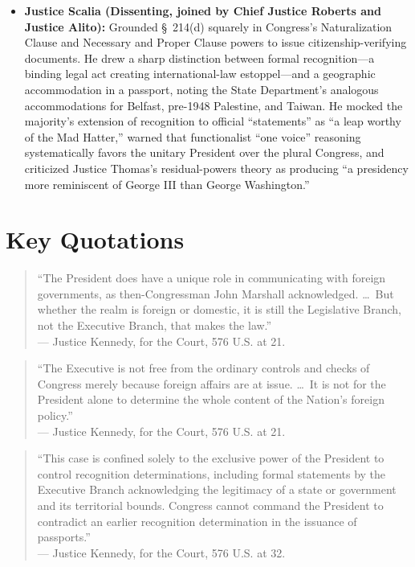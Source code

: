 \documentclass[12pt]{article}
\begin{document}
\begin{itemize}
  \item \textbf{Justice Scalia (Dissenting, joined by Chief Justice Roberts and Justice Alito):} Grounded \S~214(d) squarely in Congress's Naturalization Clause and Necessary and Proper Clause powers to issue citizenship-verifying documents. He drew a sharp distinction between formal recognition---a binding legal act creating international-law estoppel---and a geographic accommodation in a passport, noting the State Department's analogous accommodations for Belfast, pre-1948 Palestine, and Taiwan. He mocked the majority's extension of recognition to official ``statements'' as ``a leap worthy of the Mad Hatter,'' warned that functionalist ``one voice'' reasoning systematically favors the unitary President over the plural Congress, and criticized Justice Thomas's residual-powers theory as producing ``a presidency more reminiscent of George III than George Washington.''
\end{itemize}

\section{Key Quotations}
\begin{quote}
``The President does have a unique role in communicating with foreign governments, as then-Congressman John Marshall acknowledged. \dots\ But whether the realm is foreign or domestic, it is still the Legislative Branch, not the Executive Branch, that makes the law.'' \\
--- Justice Kennedy, for the Court, 576 U.S. at 21.
\end{quote}

\begin{quote}
``The Executive is not free from the ordinary controls and checks of Congress merely because foreign affairs are at issue. \dots\ It is not for the President alone to determine the whole content of the Nation's foreign policy.'' \\
--- Justice Kennedy, for the Court, 576 U.S. at 21.
\end{quote}

\begin{quote}
``This case is confined solely to the exclusive power of the President to control recognition determinations, including formal statements by the Executive Branch acknowledging the legitimacy of a state or government and its territorial bounds. Congress cannot command the President to contradict an earlier recognition determination in the issuance of passports.'' \\
--- Justice Kennedy, for the Court, 576 U.S. at 32.
\end{quote}
\end{document}
